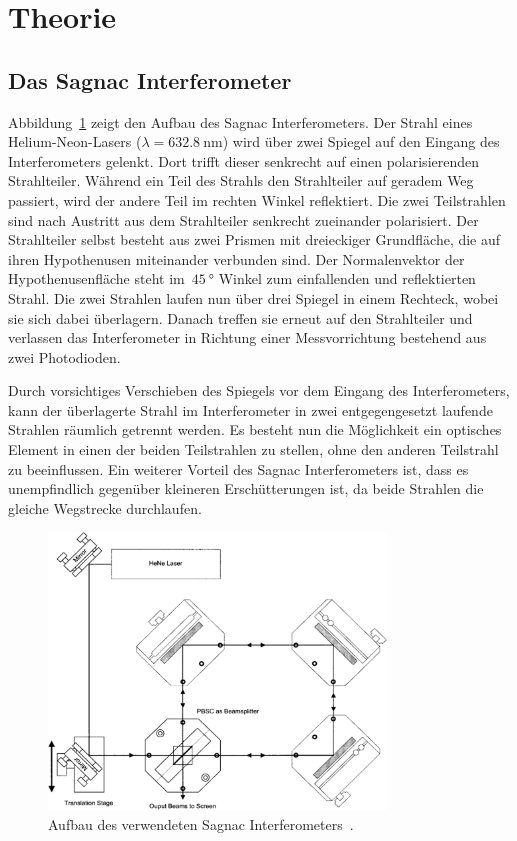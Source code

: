\section{Theorie}
\label{sec:theorie}

\subsection{Das Sagnac Interferometer}
\label{sec:theorie_das_sagnac_interferometer}
Abbildung~\ref{fig:aufbau} zeigt den Aufbau des Sagnac Interferometers. Der
Strahl eines Helium-Neon-Lasers ($\lambda=\SI{632.8}{\nano\metre}$) wird über
zwei Spiegel auf den Eingang des Interferometers gelenkt. Dort trifft dieser
senkrecht auf einen polarisierenden Strahlteiler. Während ein Teil des Strahls
den Strahlteiler auf geradem Weg passiert, wird der andere Teil im rechten
Winkel reflektiert. Die zwei Teilstrahlen sind nach Austritt aus dem
Strahlteiler senkrecht zueinander polarisiert. Der Strahlteiler selbst besteht
aus zwei Prismen mit dreieckiger Grundfläche, die auf ihren Hypothenusen
miteinander verbunden sind. Der Normalenvektor der Hypothenusenfläche steht
im~$\SI{45}{\degree}$ Winkel zum einfallenden und reflektierten Strahl. Die zwei
Strahlen laufen nun über drei Spiegel in einem Rechteck, wobei sie sich dabei
überlagern. Danach treffen sie erneut auf den Strahlteiler und verlassen das
Interferometer in Richtung einer Messvorrichtung bestehend aus zwei Photodioden.

Durch vorsichtiges Verschieben des Spiegels vor dem Eingang des Interferometers,
kann der überlagerte Strahl im Interferometer in zwei entgegengesetzt laufende
Strahlen räumlich getrennt werden. Es besteht nun die Möglichkeit ein optisches
Element in einen der beiden Teilstrahlen zu stellen, ohne den anderen Teilstrahl
zu beeinflussen. Ein weiterer Vorteil des Sagnac Interferometers ist, dass es
unempfindlich gegenüber kleineren Erschütterungen ist, da beide Strahlen die
gleiche Wegstrecke durchlaufen.
\begin{figure}[htb]
  \centering
  \includegraphics[width=0.8\textwidth]{figures/aufbau.pdf}
  \caption{Aufbau des verwendeten Sagnac Interferometers~\cite{V64}.}
  \label{fig:aufbau}
\end{figure}

